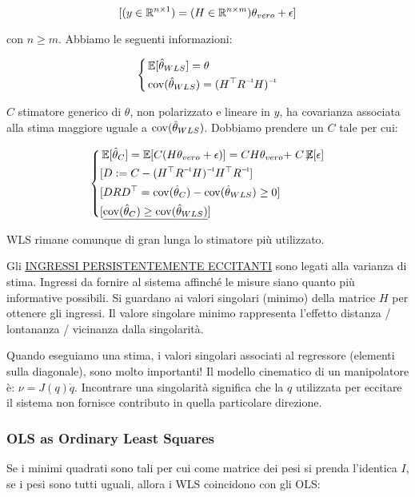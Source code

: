 \[
	[(y\in\mathbb{R}^{n\times 1})=(H\in\mathbb{R}^{n\times m})\theta_{vero}+\epsilon]
\]

con $n\geq m$. Abbiamo le seguenti informazioni:

\[
	\left\{
	\begin{aligned}
	&\E[\hat{\theta}_{WLS}]=\theta\\
	&\cov(\hat{\theta}_{WLS})=\inv{(H^\top\inv{R}H)}
	\end{aligned}
	\right.
\]

$C$ stimatore generico di $\theta$, non polarizzato e lineare in $y$, ha covarianza associata alla stima maggiore uguale a $\operatorname{cov}(\hat{\theta}_{WLS})$. Dobbiamo prendere un $C$ tale per cui:

\[
	\left\{
	\begin{aligned}
	&\E[\hat{\theta}_C] = \E[C(H\theta_{vero}+\epsilon)] = CH\theta_{vero}+\centernot{C\E[\epsilon]}\\
	&[D := C - \inv{(H^\top\inv{R}H)}H^\top\inv{R}]\\
	&[DRD^\top = \cov(\hat{\theta}_C) - \cov(\hat{\theta}_{WLS}) \geq 0]\\
	&[\underline{\cov(\hat{\theta}_C)\geq \cov(\hat{\theta}_{WLS})}]
	\end{aligned}
	\right.
\]

WLS rimane comunque di gran lunga lo stimatore più utilizzato.

Gli \underline{\underline{INGRESSI PERSISTENTEMENTE ECCITANTI}} sono legati alla varianza di stima. Ingressi da fornire al sistema affinché le misure siano quanto più informative possibili. Si guardano ai valori singolari (minimo) della matrice $H$ per ottenere gli ingressi. Il valore singolare minimo rappresenta l'effetto distanza / lontananza / vicinanza dalla singolarità.

Quando eseguiamo una stima, i valori singolari associati al regressore (elementi sulla diagonale), sono molto importanti! Il modello cinematico di un manipolatore è: $\nu=J(q)\dot{q}$. Incontrare una singolarità significa che la $q$ utilizzata per eccitare il sistema non fornisce contributo in quella particolare direzione.

\subsubsection{OLS as Ordinary Least Squares}

Se i minimi quadrati sono tali per cui come matrice dei pesi si prenda l'identica $I$, se i pesi sono tutti uguali, allora i WLS coincidono con gli OLS:

